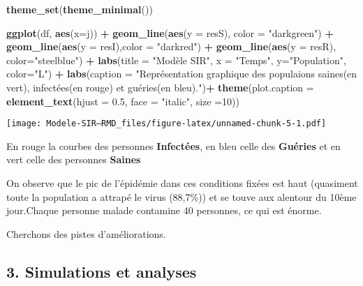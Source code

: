 \documentclass[
]{article}
\newenvironment{Shaded}{\begin{snugshade}}{\end{snugshade}}
\newcommand{\DataTypeTok}[1]{\textcolor[rgb]{0.13,0.29,0.53}{#1}}
\newcommand{\DecValTok}[1]{\textcolor[rgb]{0.00,0.00,0.81}{#1}}
\newcommand{\FloatTok}[1]{\textcolor[rgb]{0.00,0.00,0.81}{#1}}
\newcommand{\KeywordTok}[1]{\textcolor[rgb]{0.13,0.29,0.53}{\textbf{#1}}}
\newcommand{\NormalTok}[1]{#1}
\newcommand{\OperatorTok}[1]{\textcolor[rgb]{0.81,0.36,0.00}{\textbf{#1}}}
\newcommand{\StringTok}[1]{\textcolor[rgb]{0.31,0.60,0.02}{#1}}
\begin{document}
\begin{Shaded}
\begin{Highlighting}[]
\KeywordTok{theme_set}\NormalTok{(}\KeywordTok{theme_minimal}\NormalTok{())}

\KeywordTok{ggplot}\NormalTok{(df, }\KeywordTok{aes}\NormalTok{(}\DataTypeTok{x=}\NormalTok{j)) }\OperatorTok{+}\StringTok{ }\KeywordTok{geom_line}\NormalTok{(}\KeywordTok{aes}\NormalTok{(}\DataTypeTok{y =}\NormalTok{ resS), }\DataTypeTok{color =} \StringTok{"darkgreen"}\NormalTok{) }\OperatorTok{+}\StringTok{ }\KeywordTok{geom_line}\NormalTok{(}\KeywordTok{aes}\NormalTok{(}\DataTypeTok{y =}\NormalTok{ resI),}\DataTypeTok{color =} \StringTok{"darkred"}\NormalTok{) }\OperatorTok{+}\StringTok{ }\KeywordTok{geom_line}\NormalTok{(}\KeywordTok{aes}\NormalTok{(}\DataTypeTok{y =}\NormalTok{ resR), }\DataTypeTok{color=}\StringTok{"steelblue"}\NormalTok{) }\OperatorTok{+}\StringTok{ }\KeywordTok{labs}\NormalTok{(}\DataTypeTok{title =} \StringTok{"Modèle SIR"}\NormalTok{, }\DataTypeTok{x =} \StringTok{"Temps"}\NormalTok{, }\DataTypeTok{y=}\StringTok{"Population"}\NormalTok{, }\DataTypeTok{color=}\StringTok{"L"}\NormalTok{) }\OperatorTok{+}\StringTok{ }\KeywordTok{labs}\NormalTok{(}\DataTypeTok{caption =} \StringTok{"Représentation graphique des populaions saines(en vert), infectées(en rouge) et guéries(en bleu)."}\NormalTok{)}\OperatorTok{+}\StringTok{ }\KeywordTok{theme}\NormalTok{(}\DataTypeTok{plot.caption =} \KeywordTok{element_text}\NormalTok{(}\DataTypeTok{hjust =} \FloatTok{0.5}\NormalTok{, }\DataTypeTok{face =} \StringTok{"italic"}\NormalTok{, }\DataTypeTok{size =}\DecValTok{10}\NormalTok{))}
\end{Highlighting}
\end{Shaded}

\texttt{[image: Modele-SIR---RMD\_files/figure-latex/unnamed-chunk-5-1.pdf]}

En rouge la courbes des personnes \textbf{Infectées}, en bleu celle des
\textbf{Guéries} et en vert celle des personnes \textbf{Saines}

On observe que le pic de l'épidémie dans ces conditions fixées est haut
(quasiment toute la population a attrapé le virus (88,7\%)) et se touve
aux alentour du 10ème jour.Chaque personne malade contamine 40
personnes, ce qui est énorme.

Cherchons des pistes d'améliorations.

\hypertarget{simulations-et-analyses}{%
\subsection{3. Simulations et analyses}\label{simulations-et-analyses}}
\end{document}
